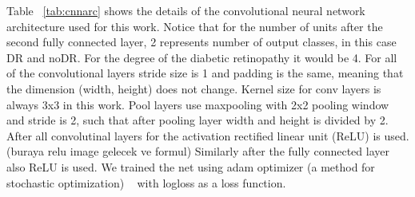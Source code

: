 Table ~\ref{tab:cnnarc} shows the details of the convolutional neural network architecture used for this work. Notice that for the number of units after the second fully connected layer, 2 represents number of output classes, in this case DR and noDR. For the degree of the diabetic retinopathy it would be 4. For all of the convolutional layers stride size is 1 and padding is the same, meaning that the dimension (width, height) does not change. Kernel size for conv layers is always 3x3 in this work. Pool layers use maxpooling with 2x2 pooling window and stride is 2, such that after pooling layer width and height is divided by 2. After all convolutinal layers for the activation rectified linear unit (ReLU) is used. (buraya relu image gelecek ve formul) Similarly after the fully connected layer also ReLU is used. 
We trained the net using adam optimizer (a method for stochastic optimization) ~\cite{kingma2014adam} with  logloss as a loss function. 





